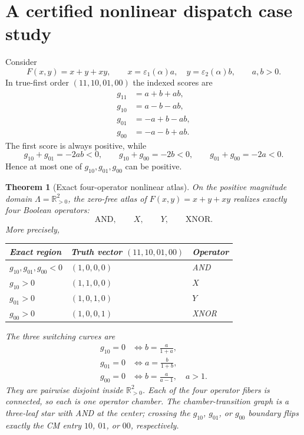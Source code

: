 \documentclass[11pt]{article}
\newtheorem{theorem}{Theorem}[section]
\theoremstyle{definition}
\theoremstyle{remark}
\newcommand{\R}{\mathbb{R}}
\newcommand{\eps}{\varepsilon}
\begin{document}
\section{A certified nonlinear dispatch case study}\label{sec:nonlinearcase}

Consider
\[
 F(x,y)=x+y+xy,
 \qquad x=\eps_1(\alpha)a,\quad y=\eps_2(\alpha)b,
 \qquad a,b>0.
\]
In true-first order $(11,10,01,00)$ the indexed scores are
\begin{align*}
 g_{11}&=a+b+ab,\\
 g_{10}&=a-b-ab,\\
 g_{01}&=-a+b-ab,\\
 g_{00}&=-a-b+ab.
\end{align*}
The first score is always positive, while
\begin{equation}\label{eq:negpairsums}
 g_{10}+g_{01}=-2ab<0,\qquad
 g_{10}+g_{00}=-2b<0,\qquad
 g_{01}+g_{00}=-2a<0.
\end{equation}
Hence at most one of $g_{10},g_{01},g_{00}$ can be positive.

\begin{theorem}[Exact four-operator nonlinear atlas]\label{thm:nonlinearatlas}
On the positive magnitude domain $\Lambda=\R_{>0}^2$, the zero-free atlas of $F(x,y)=x+y+xy$ realizes exactly four Boolean operators:
\[
 \mathrm{AND},\qquad X,\qquad Y,\qquad \mathrm{XNOR}.
\]
More precisely,
\begin{center}
\begin{tabular}{@{}lll@{}}
\toprule
Exact region & Truth vector $(11,10,01,00)$ & Operator \\
\midrule
$g_{10},g_{01},g_{00}<0$ & $(1,0,0,0)$ & AND \\
$g_{10}>0$ & $(1,1,0,0)$ & $X$ \\
$g_{01}>0$ & $(1,0,1,0)$ & $Y$ \\
$g_{00}>0$ & $(1,0,0,1)$ & XNOR \\
\bottomrule
\end{tabular}
\end{center}
The three switching curves are
\begin{align}
 g_{10}=0&\iff b=\frac{a}{1+a},\label{eq:c10}\\
 g_{01}=0&\iff a=\frac{b}{1+b},\label{eq:c01}\\
 g_{00}=0&\iff b=\frac{a}{a-1},\quad a>1.\label{eq:c00}
\end{align}
They are pairwise disjoint inside $\R_{>0}^2$. Each of the four operator fibers is connected, so each is one operator chamber. The chamber-transition graph is a three-leaf star with AND at the center; crossing the $g_{10}$, $g_{01}$, or $g_{00}$ boundary flips exactly the CM entry $10$, $01$, or $00$, respectively.
\end{theorem}
\end{document}
